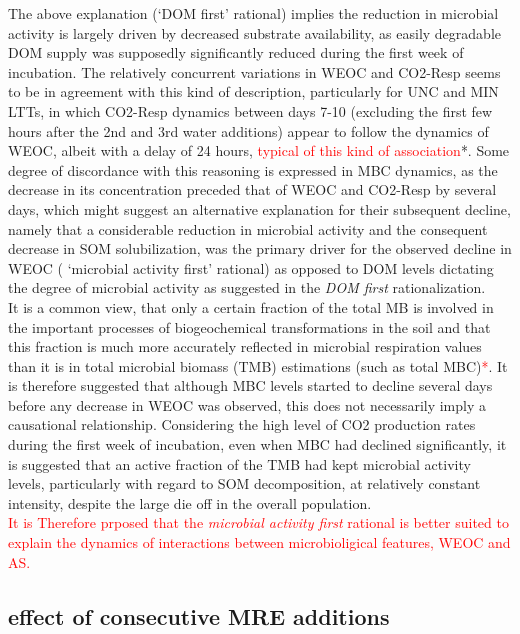 \documentclass[12pt]{report}
\newcommand{\myRed}[1]{\textcolor{red}{#1}} %
\begin{document}
		The above explanation (‘DOM first’ rational) implies  the reduction in microbial activity is largely driven by decreased substrate availability, as easily degradable DOM supply was supposedly significantly reduced during the first week of incubation. The relatively concurrent variations in WEOC and CO2-Resp seems to be in agreement with this kind of description, particularly for UNC and MIN LTTs, in which CO2-Resp dynamics between days 7-10 (excluding the first few hours after the 2nd and 3rd water additions) appear to follow the dynamics of WEOC, albeit with a delay of 24 hours,\myRed{ typical of this kind of association}*. Some  degree of discordance with this reasoning is expressed in MBC dynamics, as the decrease in its concentration preceded that of WEOC and  CO2-Resp by several days, which might suggest an alternative explanation for their subsequent decline, namely that a considerable reduction in microbial activity and the consequent decrease in SOM solubilization, was the primary driver for the observed decline in WEOC ( ‘microbial activity first’ rational) as opposed to DOM levels dictating the degree of microbial activity as suggested in the \textit{DOM first} rationalization.\\
		It is a common view, that only a certain fraction of the total MB  is involved in the important processes of biogeochemical transformations in the soil \citep{blagodatskaya2013, salazar-villegas2016} and that this fraction is much more accurately reflected in microbial respiration values than it is in total microbial biomass (TMB) estimations (such as total MBC)\myRed{*}. It is therefore suggested that although MBC levels started to decline several days before any decrease in WEOC was observed, this does not necessarily imply a causational relationship. Considering the high level of CO2 production rates during the first week of incubation, even when MBC had declined significantly, it is suggested that an active fraction of the TMB had kept microbial activity levels, particularly with regard to SOM decomposition, at relatively constant intensity, despite the large die off in the overall population. \\
		\myRed{It is Therefore prposed that the \textit{microbial activity first} rational is better suited to explain the dynamics of interactions between microbioligical features, WEOC and AS. }
			
		
	\subsection{effect of consecutive MRE additions}
	
\end{document}
